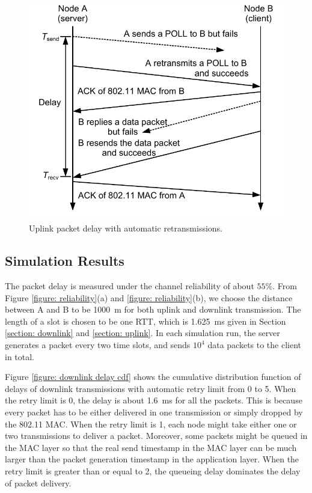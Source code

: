 \documentclass{article}
\begin{document}
\begin{figure}[htbp]
\centering
\includegraphics[scale = 0.7]{uplink_delay.pdf}
\caption{Uplink packet delay with automatic retransmissions.}
\label{figure: uplink delay}
\end{figure}

\subsection{Simulation Results}
The packet delay is measured under the channel reliability of about $55\%$. From Figure \ref{figure: reliability}(a) and \ref{figure: reliability}(b), we choose the distance between A and B to be \SI{1000}{m} for both uplink and downlink transmission. The length of a slot is chosen to be one RTT, which is \SI{1.625}{ms} given in Section \ref{section: downlink} and \ref{section: uplink}. In each simulation run, the server generates a packet every two time slots, and sends $10^4$ data packets to the client in total.

Figure \ref{figure: downlink delay cdf} shows the cumulative distribution function of delays of downlink transmissions with automatic retry limit from 0 to 5. When the retry limit is 0, the delay is about \SI{1.6}{ms} for all the packets. This is because every packet has to be either delivered in one transmission or simply dropped by the 802.11 MAC. When the retry limit is 1, each node might take either one or two transmissions to deliver a packet. Moreover, some packets might be queued in the MAC layer so that the real send timestamp in the MAC layer can be much larger than the packet generation timestamp in the application layer. When the retry limit is greater than or equal to 2, the {queueing delay} dominates the delay of packet delivery. 
\end{document}
